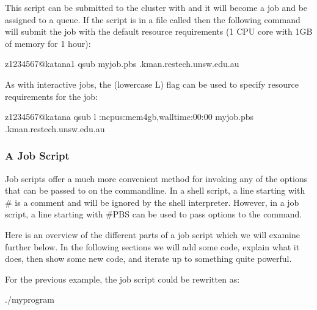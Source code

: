 \documentclass[letterpaper,10pt,english]{sphinxmanual}
\begin{document}
This script can be submitted to the cluster with  and it will become a job and be assigned to a queue. If the script is in a file called  then the following command will submit the job with the default resource requirements (1 CPU core with 1GB of memory for 1 hour):

\begin{sphinxVerbatim}[commandchars=\\\{\}]
\PYG{o}{[}z1234567@katana1 \PYGZti{}\PYG{o}{]}\PYGZdl{} qsub myjob.pbs
.kman.restech.unsw.edu.au
\end{sphinxVerbatim}

As with interactive jobs, the  (lowercase L) flag can be used to specify resource requirements for the job:

\begin{sphinxVerbatim}[commandchars=\\\{\}]
\PYG{o}{[}z1234567@katana \PYGZti{}\PYG{o}{]}\PYGZdl{} qsub \PYGZhy{}l :ncpus:mem4gb,walltime:00:00 myjob.pbs
.kman.restech.unsw.edu.au
\end{sphinxVerbatim}


\subsubsection{A Job Script}
\label{\detokenize{using_katana/running_jobs:a-job-script}}
Job scripts offer a much more convenient method for invoking any of the options that can be passed to  on the command\sphinxhyphen{}line. In a shell script, a line starting with \# is a comment and will be ignored by the shell interpreter. However, in a job script, a line starting with \#PBS can be used to pass options to the  command.

Here is an overview of the different parts of a job script which we will examine further below. In the following sections we will add some code, explain what it does, then show some new code, and iterate up to something quite powerful.

For the previous example, the job script could be rewritten as:

\begin{sphinxVerbatim}[commandchars=\\\{\}]


 

./myprogram
\end{sphinxVerbatim}
\end{document}
